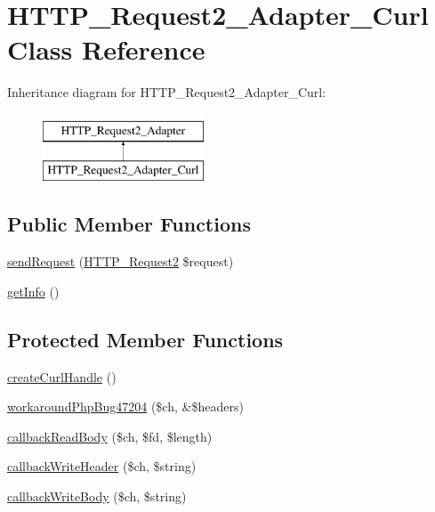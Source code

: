 \hypertarget{classHTTP__Request2__Adapter__Curl}{\section{H\-T\-T\-P\-\_\-\-Request2\-\_\-\-Adapter\-\_\-\-Curl Class Reference}
\label{classHTTP__Request2__Adapter__Curl}
}
Inheritance diagram for H\-T\-T\-P\-\_\-\-Request2\-\_\-\-Adapter\-\_\-\-Curl\-:\begin{figure}[H]
\begin{center}
\leavevmode
\includegraphics[height=2.000000cm]{classHTTP__Request2__Adapter__Curl}
\end{center}
\end{figure}
\subsection*{Public Member Functions}
\begin{DoxyCompactItemize}
\item 
\hyperlink{classHTTP__Request2__Adapter__Curl_a9da450eb1bb1492d1b39c22c2f29bb2b}{send\-Request} (\hyperlink{classHTTP__Request2}{H\-T\-T\-P\-\_\-\-Request2} \$request)
\item 
\hyperlink{classHTTP__Request2__Adapter__Curl_a9c8c318ec7a6314f235ef4dfea89e6b2}{get\-Info} ()
\end{DoxyCompactItemize}
\subsection*{Protected Member Functions}
\begin{DoxyCompactItemize}
\item 
\hyperlink{classHTTP__Request2__Adapter__Curl_a905d9fdfe01867e54cbd696091d97516}{create\-Curl\-Handle} ()
\item 
\hyperlink{classHTTP__Request2__Adapter__Curl_a3e62b54a633faf5aba9d0b4eb0a3c1d0}{workaround\-Php\-Bug47204} (\$ch, \&\$headers)
\item 
\hyperlink{classHTTP__Request2__Adapter__Curl_a02043fb25c4aa88dfe000cbb037011b0}{callback\-Read\-Body} (\$ch, \$fd, \$length)
\item 
\hyperlink{classHTTP__Request2__Adapter__Curl_a8279ebf99b6de452d163e747f34d6f11}{callback\-Write\-Header} (\$ch, \$string)
\item 
\hyperlink{classHTTP__Request2__Adapter__Curl_ad1049b669850af2040d3360144f90e8c}{callback\-Write\-Body} (\$ch, \$string)
\end{DoxyCompactItemize}
